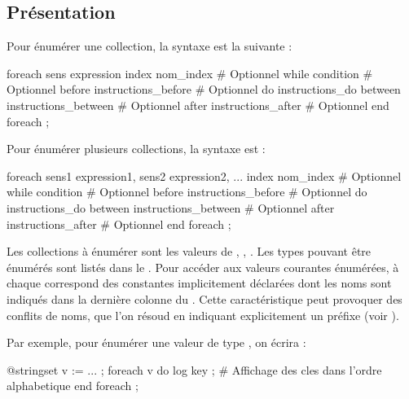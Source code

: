 \subsection{Présentation}

Pour énumérer une collection, la syntaxe est la suivante :

\begin{galgascode}
foreach sens expression
index nom_index # Optionnel
while condition # Optionnel
before instructions_before  # Optionnel
do instructions_do
between instructions_between  # Optionnel
after instructions_after  # Optionnel
end foreach ;
\end{galgascode}


Pour énumérer plusieurs collections, la syntaxe est :
\begin{galgascode}
foreach sens1 expression1, sens2 expression2, ...
index nom_index # Optionnel
while condition # Optionnel
before instructions_before  # Optionnel
do instructions_do
between instructions_between  # Optionnel
after instructions_after  # Optionnel
end foreach ;
\end{galgascode}

Les collections à énumérer sont les valeurs de , , . Les types pouvant être énumérés sont listés dans le . Pour accéder aux valeurs courantes énumérées, à chaque  correspond des constantes implicitement déclarées dont les noms sont indiqués dans la dernière colonne du . Cette caractéristique peut provoquer des conflits de noms, que l'on résoud en indiquant explicitement un préfixe (voir ).

Par exemple, pour énumérer une valeur de type , on écrira :
\begin{galgascode}
@stringset v := ... ;
foreach v do
  log key ; # Affichage des cles dans l'ordre alphabetique
end foreach ;
\end{galgascode}

